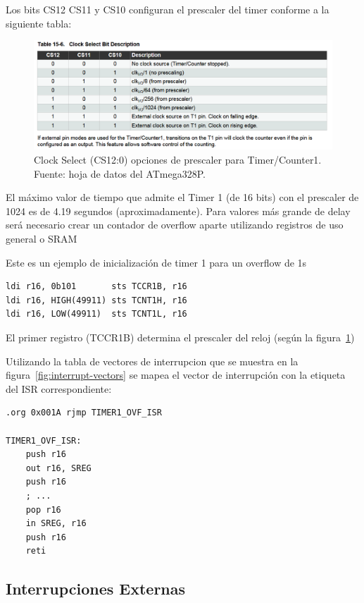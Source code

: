 Los bits CS12 CS11 y CS10 configuran el prescaler del timer conforme a la siguiente tabla: 

\begin{figure}[H]
  \centering
  \includegraphics[width=\linewidth]{./Anexos/Marco Teorico/Timers/Prescaler Table.png}
  \caption{Clock Select (CS12:0) opciones de prescaler para Timer/Counter1. Fuente: hoja de datos del ATmega328P\@\cite{atmega328p_datasheet}.}
  \label{fig:prescaler-table}
\end{figure}


El máximo valor de tiempo que admite el Timer 1 (de 16 bits) con el prescaler de 1024 es de 4.19 segundos (aproximadamente). Para valores más grande de delay será necesario crear un contador de overflow aparte utilizando registros de uso general o SRAM

Este es un ejemplo de inicialización de timer 1 para un overflow de 1s

\begin{verbatim}
ldi r16, 0b101       sts TCCR1B, r16
ldi r16, HIGH(49911) sts TCNT1H, r16
ldi r16, LOW(49911)  sts TCNT1L, r16 
\end{verbatim}

El primer registro (TCCR1B) determina el prescaler del reloj (según la figura\ \ref{fig:prescaler-table})

Utilizando la tabla de vectores de interrupcion que se muestra en la figura\ \ref{fig:interrupt-vectors} se mapea el vector de interrupción con la etiqueta del ISR correspondiente:

\begin{verbatim}
.org 0x001A rjmp TIMER1_OVF_ISR

TIMER1_OVF_ISR:
    push r16
    out r16, SREG
    push r16
    ; ... 
    pop r16
    in SREG, r16
    push r16
    reti
\end{verbatim}

\subsection{Interrupciones Externas}\label{anexo:Interrupciones_Externas}
